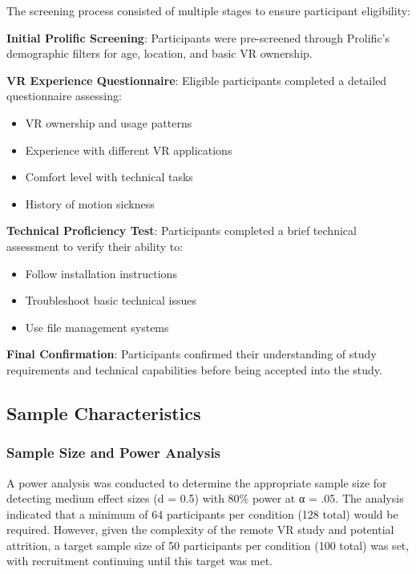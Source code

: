 \documentclass[12pt]{article}
\begin{document}
The screening process consisted of multiple stages to ensure participant eligibility:

\textbf{Initial Prolific Screening}: Participants were pre-screened through Prolific's demographic filters for age, location, and basic VR ownership.

\textbf{VR Experience Questionnaire}: Eligible participants completed a detailed questionnaire assessing:
\begin{itemize}
    \item VR ownership and usage patterns
    \item Experience with different VR applications
    \item Comfort level with technical tasks
    \item History of motion sickness
\end{itemize}

\textbf{Technical Proficiency Test}: Participants completed a brief technical assessment to verify their ability to:
\begin{itemize}
    \item Follow installation instructions
    \item Troubleshoot basic technical issues
    \item Use file management systems
\end{itemize}

\textbf{Final Confirmation}: Participants confirmed their understanding of study requirements and technical capabilities before being accepted into the study.

\subsection{Sample Characteristics}

\subsubsection{Sample Size and Power Analysis}

A power analysis was conducted to determine the appropriate sample size for detecting medium effect sizes (d = 0.5) with 80\% power at α = .05. The analysis indicated that a minimum of 64 participants per condition (128 total) would be required. However, given the complexity of the remote VR study and potential attrition, a target sample size of 50 participants per condition (100 total) was set, with recruitment continuing until this target was met.
\end{document}
